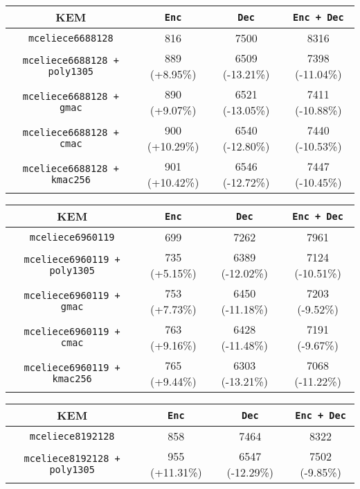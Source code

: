 \documentclass[runningheads]{llncs}
\begin{document}
\begin{table}[h]
\begin{tabular}[c]{|c|c|c|c|}
        \hline
    \end{tabular}\vspace{1em}
    \begin{tabular}[c]{|c|c|c|c|}
        \hline
        KEM & \texttt{Enc} & \texttt{Dec} & \texttt{Enc + Dec} \\
        \hline
        \texttt{mceliece6688128} & 816 & 7500 & 8316 \\
        \hline
        \texttt{mceliece6688128 + poly1305} & 889 (+8.95\%) & 6509 (-13.21\%) & 7398 (-11.04\%) \\
        \hline
        \texttt{mceliece6688128 + gmac} & 890 (+9.07\%) & 6521 (-13.05\%) & 7411 (-10.88\%) \\
        \hline
        \texttt{mceliece6688128 + cmac} & 900 (+10.29\%) & 6540 (-12.80\%) & 7440 (-10.53\%) \\
        \hline
        \texttt{mceliece6688128 + kmac256} & 901 (+10.42\%) & 6546 (-12.72\%) & 7447 (-10.45\%) \\
        \hline
    \end{tabular}\vspace{1em}
    \begin{tabular}[c]{|c|c|c|c|}
        \hline
        KEM & \texttt{Enc} & \texttt{Dec} & \texttt{Enc + Dec} \\
        \hline
        \texttt{mceliece6960119} & 699 & 7262 & 7961 \\
        \hline
        \texttt{mceliece6960119 + poly1305} & 735 (+5.15\%) & 6389 (-12.02\%) & 7124 (-10.51\%) \\
        \hline
        \texttt{mceliece6960119 + gmac} & 753 (+7.73\%) & 6450 (-11.18\%) & 7203 (-9.52\%) \\
        \hline
        \texttt{mceliece6960119 + cmac} & 763 (+9.16\%) & 6428 (-11.48\%) & 7191 (-9.67\%) \\
        \hline
        \texttt{mceliece6960119 + kmac256} & 765 (+9.44\%) & 6303 (-13.21\%) & 7068 (-11.22\%) \\
        \hline
    \end{tabular}\vspace{1em}
    \begin{tabular}[c]{|c|c|c|c|}
        \hline
        KEM & \texttt{Enc} & \texttt{Dec} & \texttt{Enc + Dec} \\
        \hline
        \texttt{mceliece8192128} & 858 & 7464 & 8322 \\
        \hline
        \texttt{mceliece8192128 + poly1305} & 955 (+11.31\%) & 6547 (-12.29\%) & 7502 (-9.85\%) \\

\end{tabular}
\end{table}
\end{document}
